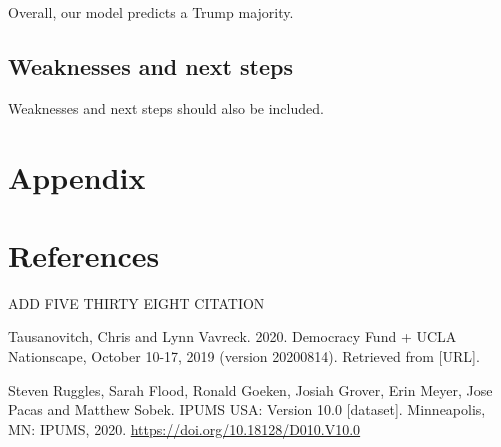 \documentclass[
]{article}
\begin{document}
Overall, our model predicts a Trump majority.

\hypertarget{weaknesses-and-next-steps}{%
\subsection{Weaknesses and next steps}\label{weaknesses-and-next-steps}}

Weaknesses and next steps should also be included.

\newpage

\hypertarget{appendix}{%
\section*{Appendix}\label{appendix}}

\newpage

\hypertarget{references}{%
\section{References}\label{references}}

ADD FIVE THIRTY EIGHT CITATION

Tausanovitch, Chris and Lynn Vavreck. 2020. Democracy Fund + UCLA Nationscape, October 10-17, 2019 (version 20200814). Retrieved from {[}URL{]}.

Steven Ruggles, Sarah Flood, Ronald Goeken, Josiah Grover, Erin Meyer, Jose Pacas and Matthew Sobek. IPUMS USA: Version 10.0 {[}dataset{]}. Minneapolis, MN: IPUMS, 2020. \url{https://doi.org/10.18128/D010.V10.0}

  
\end{document}
